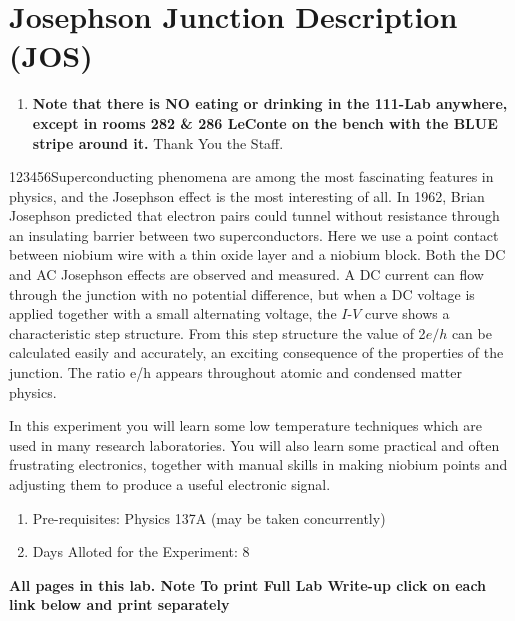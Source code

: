 \documentclass{../lab}
\begin{document}
\maketitle

\tableofcontents

\section{Josephson Junction Description (JOS)}

\begin{enumerate}
    \item \textbf{Note that there is NO eating or drinking in the 111-Lab anywhere, except in rooms 282 \& 286 LeConte on the bench with the BLUE stripe around it.} Thank You the Staff.
\end{enumerate}

123456Superconducting phenomena are among the most fascinating features in physics, and the Josephson effect is the most interesting of all. In 1962, Brian Josephson predicted that electron pairs could tunnel without resistance through an insulating barrier between two superconductors. Here we use a point contact between niobium wire with a thin oxide layer and a niobium block. Both the DC and AC Josephson effects are observed and measured. A DC current can flow through the junction with no potential difference, but when a DC voltage is applied together with a small alternating voltage, the $I$-$V$ curve shows a characteristic step structure. From this step structure the value of 2$e/h$ can be calculated easily and accurately, an exciting consequence of the properties of the junction. The ratio e/h appears throughout atomic and condensed matter physics.

In this experiment you will learn some low temperature techniques which are used in many research laboratories. You will also learn some practical and often frustrating electronics, together with manual skills in making niobium points and adjusting them to produce a useful electronic signal.

\begin{enumerate}
    \item Pre-requisites: Physics 137A (may be taken concurrently)

    \item Days Alloted for the Experiment: 8
\end{enumerate}

\textbf{All pages in this lab. Note To print Full Lab Write-up click on each link below and print separately }
\end{document}
